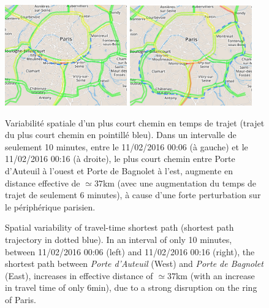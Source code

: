 

\begin{figure}
\centering
\vspace{1.5cm}
\includegraphics[width=0.47\textwidth]{Figures/TransportationEquilibrium/gr21}\hfill
\includegraphics[width=0.47\textwidth]{Figures/TransportationEquilibrium/gr22}
\caption{Spatial variability of travel-time shortest path (shortest path trajectory in dotted blue). In an interval of only 10 minutes, between 11/02/2016 00:06 (left) and 11/02/2016 00:16 (right), the shortest path between \emph{Porte d'Auteuil} (West) and \emph{Porte de Bagnolet} (East), increases in effective distance of $\simeq 37$km (with an increase in travel time of only 6min), due to a strong disruption on the ring of Paris.}{Variabilité spatiale d'un plus court chemin en temps de trajet (trajet du plus court chemin en pointillé bleu). Dans un intervalle de seulement 10 minutes, entre le 11/02/2016 00:06 (à gauche) et le 11/02/2016 00:16 (à droite), le plus court chemin entre Porte d'Auteuil à l'ouest et Porte de Bagnolet à l'est, augmente en distance effective de $\simeq 37$km (avec une augmentation du temps de trajet de seulement 6 minutes), à cause d'une forte perturbation sur le périphérique parisien.}
\label{fig:fig-2}
\end{figure}



